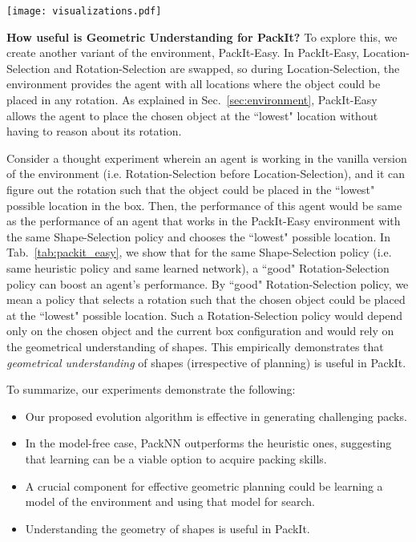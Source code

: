 \documentclass{article}
\begin{document}
\begin{figure*}
    \centering
    \texttt{[image: visualizations.pdf]}
    \caption{Some visualizations of packs in PackIt. Groud-truth shows one packing solution. The first row shows cases where Learning\footnotemark[3] outperforms Heuristic, while the second row shows vice-versa.}
    \label{fig:visual}
\end{figure*}
\noindent\textbf{How useful is Geometric Understanding for PackIt?} To explore this, we create another variant of the environment, PackIt-Easy. In PackIt-Easy, Location-Selection and Rotation-Selection are swapped, so during Location-Selection, the environment provides the agent with all locations where the object could be placed in any rotation. As explained in Sec.~\ref{sec:environment}, PackIt-Easy allows the agent to place the chosen object at the ``lowest" location without having to reason about its rotation.

Consider a thought experiment wherein an agent is working in the vanilla version of the environment (i.e. Rotation-Selection before Location-Selection), and it can figure out the rotation such that the object could be placed in the ``lowest" possible location in the box. Then, the performance of this agent would be same as the performance of an agent that works in the PackIt-Easy environment with the same Shape-Selection policy and chooses the ``lowest" possible location. In Tab.~\ref{tab:packit_easy}, we show that for the same Shape-Selection policy (i.e. same heuristic policy and same learned network), a ``good" Rotation-Selection policy can boost an agent's performance. By ``good" Rotation-Selection policy, we mean a policy that selects a rotation such that the chosen object could be placed at the ``lowest" possible location. Such a Rotation-Selection policy would depend only on the chosen object and the current box configuration and would rely on the geometrical understanding of shapes. This empirically demonstrates that \textit{geometrical understanding} of shapes (irrespective of planning) is useful in PackIt.

To summarize, our experiments demonstrate the following:
\vspace{-0.2cm}
\begin{itemize}
    \itemsep0em
    \item Our proposed evolution algorithm is effective in generating challenging packs.
    \item In the model-free case, PackNN outperforms the heuristic ones, suggesting that learning can be a viable option to acquire packing skills.
    \item A crucial component for effective geometric planning could be learning a model of the environment and using that model for search.
    \item Understanding the geometry of shapes is useful in PackIt.
\end{itemize}
\vspace{-0.2cm}
\end{document}
